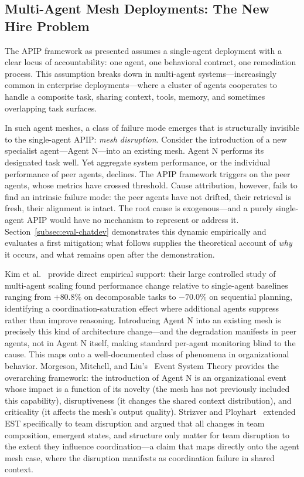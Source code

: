 \subsection{Multi-Agent Mesh Deployments: The New Hire Problem}
\label{subsec:mesh}

The APIP framework as presented assumes a single-agent deployment with a clear
locus of accountability: one agent, one behavioral contract, one remediation
process. This assumption breaks down in multi-agent systems---increasingly
common in enterprise deployments---where a cluster of agents cooperates to
handle a composite task, sharing context, tools, memory, and sometimes
overlapping task surfaces.

In such agent meshes, a class of failure mode emerges that is structurally
invisible to the single-agent APIP: \emph{mesh disruption}. Consider the
introduction of a new specialist agent---Agent N---into an existing mesh. Agent
N performs its designated task well. Yet aggregate system performance, or the
individual performance of peer agents, declines. The APIP framework triggers on
the peer agents, whose metrics have crossed threshold. Cause attribution,
however, fails to find an intrinsic failure mode: the peer agents have not
drifted, their retrieval is fresh, their alignment is intact. The root cause is
exogenous---and a purely single-agent APIP would have no mechanism to represent
or address it. Section~\ref{subsec:eval-chatdev} demonstrates this dynamic
empirically and evaluates a first mitigation; what follows supplies the
theoretical account of \emph{why} it occurs, and what remains open after the
demonstration.

Kim et al.~\cite{kim2025scaling} provide direct empirical support: their large
controlled study of multi-agent scaling found performance change relative to
single-agent baselines ranging from $+80.8\%$ on decomposable tasks to
$-70.0\%$ on sequential planning, identifying a coordination-saturation effect
where additional agents suppress rather than improve reasoning. Introducing
Agent N into an existing mesh is precisely this kind of architecture
change---and the degradation manifests in peer agents, not in Agent N itself,
making standard per-agent monitoring blind to the cause. This maps onto a
well-documented class of phenomena in organizational behavior. Morgeson,
Mitchell, and Liu's~\cite{morgeson2015event} Event System Theory provides the
overarching framework: the introduction of Agent N is an organizational event
whose impact is a function of its novelty (the mesh has not previously included
this capability), disruptiveness (it changes the shared context distribution),
and criticality (it affects the mesh's output quality). Strizver and
Ployhart~\cite{strizver2024disruption} extended EST specifically to team
disruption and argued that all changes in team composition, emergent states,
and structure only matter for team disruption to the extent they influence
coordination---a claim that maps directly onto the agent mesh case, where the
disruption manifests as coordination failure in shared context.

